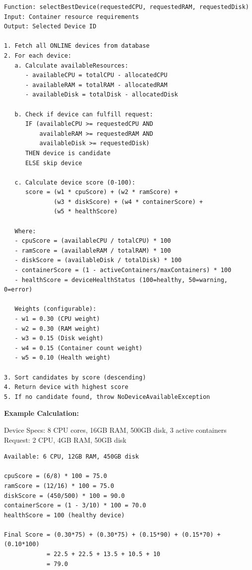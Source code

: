 \documentclass[12pt,a4paper]{article}
\begin{document}
\begin{verbatim}
Function: selectBestDevice(requestedCPU, requestedRAM, requestedDisk)
Input: Container resource requirements
Output: Selected Device ID

1. Fetch all ONLINE devices from database
2. For each device:
   a. Calculate availableResources:
      - availableCPU = totalCPU - allocatedCPU
      - availableRAM = totalRAM - allocatedRAM
      - availableDisk = totalDisk - allocatedDisk
   
   b. Check if device can fulfill request:
      IF (availableCPU >= requestedCPU AND 
          availableRAM >= requestedRAM AND 
          availableDisk >= requestedDisk)
      THEN device is candidate
      ELSE skip device
   
   c. Calculate device score (0-100):
      score = (w1 * cpuScore) + (w2 * ramScore) + 
              (w3 * diskScore) + (w4 * containerScore) + 
              (w5 * healthScore)
   
   Where:
   - cpuScore = (availableCPU / totalCPU) * 100
   - ramScore = (availableRAM / totalRAM) * 100
   - diskScore = (availableDisk / totalDisk) * 100
   - containerScore = (1 - activeContainers/maxContainers) * 100
   - healthScore = deviceHealthStatus (100=healthy, 50=warning, 0=error)
   
   Weights (configurable):
   - w1 = 0.30 (CPU weight)
   - w2 = 0.30 (RAM weight)
   - w3 = 0.15 (Disk weight)
   - w4 = 0.15 (Container count weight)
   - w5 = 0.10 (Health weight)
   
3. Sort candidates by score (descending)
4. Return device with highest score
5. If no candidate found, throw NoDeviceAvailableException
\end{verbatim}

\textbf{Example Calculation:}

Device Specs: 8 CPU cores, 16GB RAM, 500GB disk, 3 active containers\\
Request: 2 CPU, 4GB RAM, 50GB disk

\begin{verbatim}
Available: 6 CPU, 12GB RAM, 450GB disk

cpuScore = (6/8) * 100 = 75.0
ramScore = (12/16) * 100 = 75.0
diskScore = (450/500) * 100 = 90.0
containerScore = (1 - 3/10) * 100 = 70.0
healthScore = 100 (healthy device)

Final Score = (0.30*75) + (0.30*75) + (0.15*90) + (0.15*70) + (0.10*100)
            = 22.5 + 22.5 + 13.5 + 10.5 + 10
            = 79.0
\end{verbatim}
\end{document}
